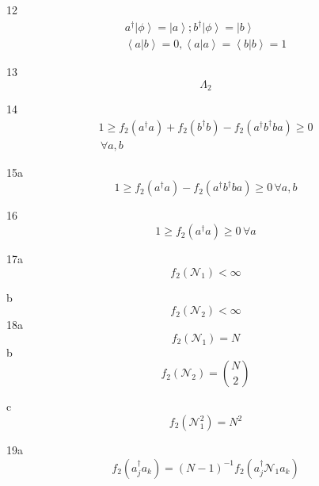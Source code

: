 \documentclass[aps,preprint]{revtex4}%
\begin{document}
12%
\begin{gather*}
a^{\dagger}\left\vert \phi\right\rangle =\left\vert a\right\rangle
;b^{\dagger}\left\vert \phi\right\rangle =\left\vert b\right\rangle \\
\left\langle a\left\vert b\right.  \right\rangle =0,\left\langle a\left\vert
a\right.  \right\rangle =\left\langle b\left\vert b\right.  \right\rangle =1
\end{gather*}


13%
\[
\Lambda_{2}%
\]


14%
\begin{gather*}
1\geq f_{2}\left(  a^{\dagger}a\right)  +f_{2}\left(  b^{\dagger}b\right)
-f_{2}\left(  a^{\dagger}b^{\dagger}ba\right)  \geq0\\
\,\forall a,b
\end{gather*}


15a%
\[
1\geq f_{2}\left(  a^{\dagger}a\right)  -f_{2}\left(  a^{\dagger}b^{\dagger
}ba\right)  \geq0\,\forall a,b
\]




16%
\[
1\geq f_{2}\left(  a^{\dagger}a\right)  \geq0\,\forall a
\]


17a%
\[
f_{2}\left(  \mathcal{N}_{1}\right)  <\infty
\]


b%
\[
f_{2}\left(  \mathcal{N}_{2}\right)  <\infty
\]
18a%
\[
f_{2}\left(  \mathcal{N}_{1}\right)  =N
\]
b%
\[
f_{2}\left(  \mathcal{N}_{2}\right)  =\binom{N}{2}%
\]


c%
\[
f_{2}\left(  \mathcal{N}_{1}^{2}\right)  =N^{2}%
\]


19a%
\[
f_{2}\left(  a_{j}^{\dagger}a_{k}\right)  =\left(  N-1\right)  ^{-1}%
f_{2}\left(  a_{j}^{\dagger}\mathcal{N}_{1}a_{k}\right)
\]
\end{document}
